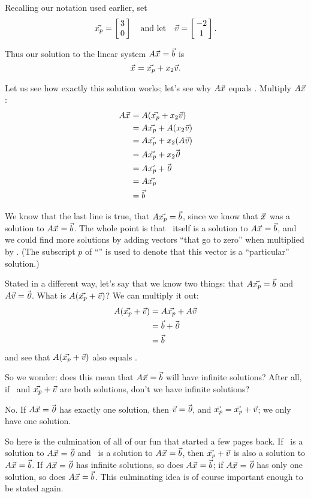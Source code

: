 Recalling our notation used earlier, set $$\vect{x_p} = \bmx{c} 3\\0\emx \quad \text{and let} \quad  \vv = \bmx{c}-2\\1\emx.$$

Thus our solution to the linear system $\tta\vx = \vb$ is $$\vx = \vect{x_p} + x_2\vv.$$

Let us see how exactly this solution works; let's see why $\tta\vx$ equals \vb.  Multiply $\tta\vx$: \begin{align*} \tta\vx &=\tta(\vect{x_p}+x_2\vv) \\ &= \tta\vect{x_p} + \tta(x_2\vv)\\ &= \tta\vect{x_p} + x_2(\tta\vv) \\ &= \tta\vect{x_p} + x_2\zero \\ &= \tta\vect{x_p} + \zero \\ &= \tta\vect{x_p}\\ &=\vb \end{align*}

We know that the last line is true, that $\tta\vect{x_p} = \vb$, since we know that $\vx$ was a solution to $\tta\vx = \vb$. The whole point is that \ itself is a solution to $\tta\vx = \vb$, and we could find more solutions by adding vectors ``that go to zero'' when multiplied by \tta. (The subscript $p$ of ``'' is used to denote that this vector is a ``particular'' solution.)

Stated in a different way, let's say that we know two things: that $\tta\vect{x_p} = \vb$ and $\tta\vv = \zero$. What is $\tta(\vect{x_p}+\vv)$? We can multiply it out: \begin{align*} \tta(\vect{x_p}+\vv) &= \tta\vect{x_p} + \tta\vv \\&= \vb + \zero \\ &= \vb\end{align*} and see that $\tta(\vect{x_p}+\vv)$ also equals \vb.

So we wonder: does this mean that $\tta\vx = \vb$ will have infinite solutions? After all, if \ and $\vect{x_p}+\vv$ are both solutions, don't we have infinite solutions?

No. If $\tta\vx = \zero$ has exactly one solution, then $\vv = \zero$, and $\vect{x_p} = \vect{x_p} +\vv$; we only have one solution.

So here is the culmination of all of our fun that started a few pages back. %
 If \vv\ is a solution to $\tta\vx=\zero$ and \ is a solution to $\tta\vx=\vb$, then $\vect{x_p}+\vv$ is also a solution to $\tta\vx=\vb$. If $\tta\vx=\zero$ has infinite solutions, so does $\tta\vx = \vb$; if $\tta\vx=\zero$ has only one solution, so does $\tta\vx = \vb$. This culminating idea is of course important enough to be stated again.

